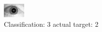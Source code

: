 \begin{figure}[h!]
\begin{center}
\includegraphics[width=0.60\columnwidth]{figures/ID1669_class_3_target_2.png}
\end{center}
\caption{ Classification: 3 actual target: 2}
\label{fig:ID1669_class_3_target_2}
\end{figure}
